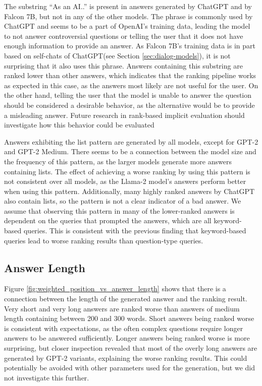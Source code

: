 The substring ``As an AI..'' is present in answers generated by ChatGPT and by Falcon 7B, but not in any of the other models.
The phrase is commonly used by ChatGPT and seems to be a part of OpenAI's training data, leading the model to not answer controversial questions or telling the user that it does not have enough information to provide an answer.
As Falcon 7B's training data is in part based on self-chats of ChatGPT(see Section \ref{sec:dialog-models}), it is not surprising that it also uses this phrase.
Answers containing this substring are ranked lower than other answers, which indicates that the ranking pipeline works as expected in this case, as the answers most likely are not useful for the user.
On the other hand, telling the user that the model is unable to answer the question should be considered a desirable behavior, as the alternative would be to provide a misleading answer.
Future research in rank-based implicit evaluation should investigate how this behavior could be evaluated

Answers exhibiting the list pattern are generated by all models, except for GPT-2 and GPT-2 Medium.
There seems to be a connection between the model size and the frequency of this pattern, as the larger models generate more answers containing lists.
The effect of achieving a worse ranking by using this pattern is not consistent over all models, as the Llama-2 model's answers perform better when using this pattern.
Additionally, many highly ranked answers by ChatGPT also contain lists, so the pattern is not a clear indicator of a bad answer.
We assume that observing this pattern in many of the lower-ranked answers is dependent on the queries that prompted the answers, which are all keyword-based queries.
This is consistent with the previous finding that keyword-based queries lead to worse ranking results than question-type queries.

\subsection{Answer Length}
Figure \ref{fig:weighted_position_vs_answer_length} shows that there is a connection between the length of the generated answer and the ranking result.
Very short and very long answers are ranked worse than answers of medium length containing between 200 and 300 words.
Short answers being ranked worse is consistent with expectations, as the often complex questions require longer answers to be answered sufficiently.
Longer answers being ranked worse is more surprising, but closer inspection revealed that most of the overly long answers are generated by GPT-2 variants, explaining the worse ranking results.
This could potentially be avoided with other parameters used for the generation, but we did not investigate this further.


